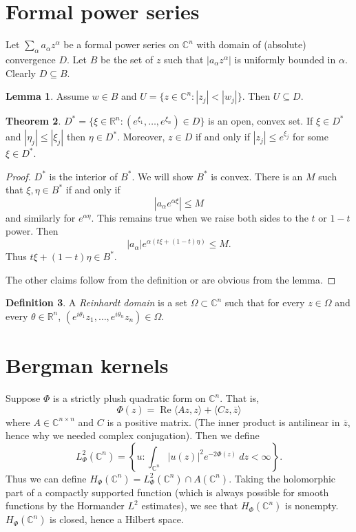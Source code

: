 \documentclass[12pt]{report}
\newcommand{\RR}{\mathbb{R}}
\newcommand{\CC}{\mathbb{C}}
\renewcommand{\Re}{\operatorname{Re}}
\newcommand{\dfn}[1]{\emph{#1}\index{#1}}
\theoremstyle{definition}
\newtheorem{theorem}{Theorem}[chapter]
\newtheorem{lemma}[theorem]{Lemma}
\newtheorem{definition}[theorem]{Definition}
\begin{document}
\section{Formal power series}
Let $\sum_\alpha a_\alpha z^\alpha$ be a formal power series on $\CC^n$ with domain of (absolute) convergence $D$. Let $B$ be the set of $z$ such that $|a_\alpha z^\alpha|$ is uniformly bounded in $\alpha$. Clearly $D \subseteq B$.
\begin{lemma}
    Assume $w \in B$ and $U = \{z \in \CC^n: |z_j| < |w_j|\}$. Then $U \subseteq D$.
\end{lemma}
\begin{theorem}
    $D^* = \{\xi \in \RR^n: (e^{\xi_1}, \dots, e^{\xi_n}) \in D\}$ is an open, convex set. If $\xi \in D^*$ and $|\eta_j| \leq |\xi_j|$ then $\eta \in D^*$. Moreover, $z \in D$ if and only if $|z_j| \leq e^{\xi_j}$ for some $\xi \in D^*$.
\end{theorem}
\begin{proof}
    $D^*$ is the interior of $B^*$. We will show $B^*$ is convex. There is an $M$ such that $\xi, \eta \in B^*$ if and only if
    $$|a_\alpha e^{\alpha\xi}| \leq M$$
    and similarly for $e^{\alpha\eta}$. This remains true when we raise both sides to the $t$ or $1-t$ power. Then
    $$|a_\alpha|e^{\alpha(t\xi + (1-t)\eta)} \leq M.$$
    Thus $t\xi + (1-t)\eta \in B^*$.

    The other claims follow from the definition or are obvious from the lemma.
\end{proof}
\begin{definition}
    A \dfn{Reinhardt domain} is a set $\Omega \subset \CC^n$ such that for every $z \in \Omega$ and every $\theta \in \RR^n$, $(e^{i\theta_1} z_1, \dots, e^{i\theta_n} z_n) \in \Omega$.
\end{definition}


\section{Bergman kernels}
Suppose $\Phi$ is a strictly plush quadratic form on $\CC^n$. That is,
$$\Phi(z) = \Re \langle Az, z\rangle + \langle Cz, \overline z \rangle$$
where $A \in \CC^{n \times n}$ and $C$ is a positive matrix. (The inner product is antilinear in $\overline z$, hence why we needed complex conjugation). Then we define
$$L^2_\Phi(\CC^n) = \left\{u: \int_{\CC^n} |u(z)|^2 e^{-2\Phi(z)} ~dz < \infty\right\}.$$
Thus we can define $H_\Phi(\CC^n) = L^2_\Phi(\CC^n) \cap A(\CC^n)$. Taking the holomorphic part of a compactly supported function (which is always possible for smooth functions by the Hormander $L^2$ estimates), we see that $H_\Phi(\CC^n)$ is nonempty. $H_\Phi(\CC^n)$ is closed, hence a Hilbert space.
\end{document}
